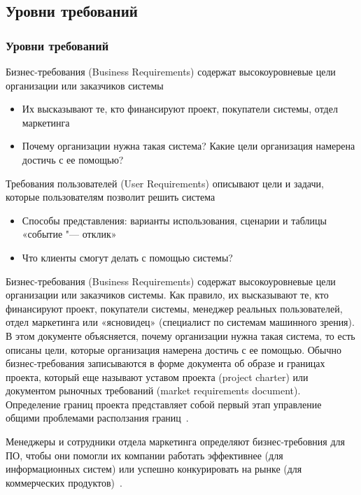 \documentclass{../industrial-development}
\begin{document}
\subsection{Уровни требований}
\begin{frame} \frametitle{Уровни требований}
  \begin{block}{}
\alert{Бизнес-требования (Business Requirements)} содержат высокоуровневые цели организации или заказчиков системы
  \end{block}
   \begin{itemize}
\item Их высказывают те, кто финансируют проект, покупатели системы, отдел маркетинга
\item Почему организации нужна такая система? Какие цели организация намерена достичь с ее помощью?
\end{itemize}
  \begin{block}{}
\alert{Требования пользователей (User Requirements)} описывают цели и задачи, которые пользователям позволит решить система 
    \end{block}
 \begin{itemize}
	\item Способы представления: варианты использования, сценарии и таблицы «событие "--- отклик»
	\item Что клиенты смогут делать с помощью системы?
  \end{itemize}
\end{frame}

\lecturenotes

\alert{Бизнес-требования (Business Requirements)} содержат высокоуровневые цели организации или заказчиков системы. Как правило, их высказывают те, кто финансируют проект, покупатели системы, менеджер реальных пользователей, отдел маркетинга или «ясновидец» (специалист по системам машинного зрения). В этом документе объясняется, почему организации нужна такая система, то есть описаны цели, которые организация намерена достичь с ее помощью. Обычно бизнес-требования записываются в форме документа об образе и границах проекта, который еще называют уставом проекта (project charter) или документом рыночных требований (market requirements document).
Определение границ проекта представляет собой первый этап управление общими проблемами расползания границ~\cite[с.~7]{Wiegers}.

Менеджеры и сотрудники отдела маркетинга определяют бизнес-требовния для ПО, чтобы они помогли их компании работать эффективнее (для информационных систем) или успешно конкурировать на рынке (для коммерческих продуктов)~\cite[с.~11]{Wiegers}.
\end{document}
